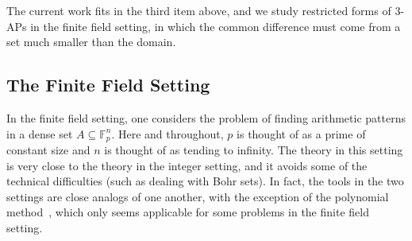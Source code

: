 \documentclass[10pt,a4paper]{amsart}
\begin{document}
The current work fits in the third item above, and we study restricted forms of $3$-APs in the finite field setting, in which the common difference must come from a set much smaller than the domain.

\subsection{The Finite Field Setting}
In the finite field setting, one considers the problem of finding arithmetic patterns in a dense set $A\subseteq \mathbb{F}_p^n$. Here and throughout, $p$ is thought of as a prime of constant size and $n$ is thought of as tending to infinity.  The theory in this setting is very close  to the theory in the integer setting, and it avoids some of the technical difficulties (such as dealing with Bohr sets). In fact, the tools in the two settings are close analogs of one another, with the exception of the polynomial method~\cite{CrootLevPach2017,EllenbergGijswijt2017}, which only seems applicable for some problems in the finite field setting. 
\end{document}
